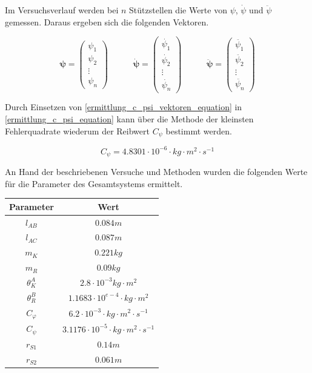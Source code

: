 Im Versuchsverlauf werden bei $n$ Stützstellen die Werte von $\psi$, $\dot{\psi}$ und $\ddot{\psi}$ gemessen. Daraus ergeben sich die folgenden Vektoren.

\begin{equation}
\label{ermittlung_c_psi_vektoren_equation}
\boldsymbol{\psi} = \begin{pmatrix} \psi_1 \\ \psi_2 \\ \vdots \\ \psi_n \end{pmatrix} \hspace{35pt}
\boldsymbol{\dot{\psi}} = \begin{pmatrix}
\dot{\psi_1} \\ \dot{\psi_2} \\ \vdots \\ \dot{\psi_n}
\end{pmatrix} \hspace{35pt}
\boldsymbol{\ddot{\psi}} = \begin{pmatrix}
\ddot{\psi_1} \\ \ddot{\psi_2} \\ \vdots \\ \ddot{\psi_n}
\end{pmatrix}
\end{equation}

Durch Einsetzen von \ref{ermittlung_c_psi_vektoren_equation} in \ref{ermittlung_c_psi_equation} kann über die Methode der kleinsten Fehlerquadrate wiederum der Reibwert $C_\psi$ bestimmt werden.

\begin{equation}
C_{\psi}= 4.8301 \cdot 10^{-6} \cdot kg \cdot m^2 \cdot s^{-1}
\end{equation}

An Hand der beschriebenen Versuche und Methoden wurden die folgenden Werte für die Parameter des Gesamtsystems ermittelt.

\begin{table}[h]
\centering
\begin{tabular}{|c|c|}
	\hline
	\textbf{Parameter} & \textbf{Wert} \\ \hline
	$l_{AB}$ & $0.084m$\\ \hline
	$l_{AC}$ & $0.087m$ \\ \hline
	$m_K$ & $0.221kg$ \\ \hline
	$m_R$ & $0.09kg$ \\ \hline
	${\theta}^A_K$ & $2.8 \cdot 10^{-3}kg \cdot m^2$ \\ \hline
	${\theta}^B_R$ & $1.1683 \cdot 10^{e-4} \cdot kg \cdot m^2$ \\ \hline
	$C_{\varphi}$ & $6.2 \cdot 10^{-3} \cdot kg \cdot m^2 \cdot s^{-1}$ \\ \hline
	$C_{\psi}$ & $3.1176 \cdot 10^{-5} \cdot kg \cdot m^2 \cdot s^{-1}$ \\ \hline
	$r_{S1}$ & $0.14m$ \\ \hline
	$r_{S2}$ & $0.061m$ \\ \hline
\end{tabular}
\end{table}

